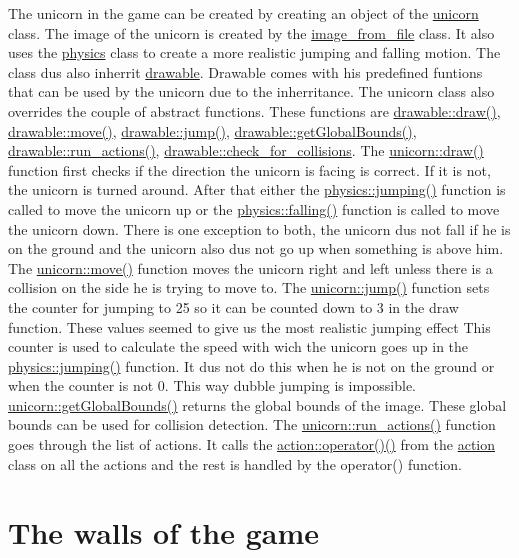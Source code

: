 The unicorn in the game can be created by creating an object of the \hyperlink{classunicorn}{unicorn} class. The image of the unicorn is created by the \hyperlink{classimage__from__file}{image\+\_\+from\+\_\+file} class. It also uses the \hyperlink{classphysics}{physics} class to create a more realistic jumping and falling motion. The class dus also inherrit \hyperlink{classdrawable}{drawable}. Drawable comes with his predefined funtions that can be used by the unicorn due to the inherritance. The unicorn class also overrides the couple of abstract functions. These functions are \hyperlink{classdrawable_a4e49e2c1121704c83ce24c5f48dd910f}{drawable\+::draw()}, \hyperlink{classdrawable_ad0d3930c045cc6776aa2c3965be32491}{drawable\+::move()}, \hyperlink{classdrawable_ac39691470b7874f5dec59efe649d3981}{drawable\+::jump()}, \hyperlink{classdrawable_ae013ac0be47538be9ce885d6642daf73}{drawable\+::get\+Global\+Bounds()}, \hyperlink{classdrawable_a715df01a318331e5611a2b0ad30109ff}{drawable\+::run\+\_\+actions()}, \hyperlink{classdrawable_abbc6e0089d502ba48c3fcb9c96e3966e}{drawable\+::check\+\_\+for\+\_\+collisions}. The \hyperlink{classunicorn_a570c34d5669a8d2a61bdc1481e6f9dee}{unicorn\+::draw()} function first checks if the direction the unicorn is facing is correct. If it is not, the unicorn is turned around. After that either the \hyperlink{classphysics_aaf1c57aa6e35b9c83ccbfdfa8c18468c}{physics\+::jumping()} function is called to move the unicorn up or the \hyperlink{classphysics_acca1ee2fb8b760b6e4ee61ae7c2ee3da}{physics\+::falling()} function is called to move the unicorn down. There is one exception to both, the unicorn dus not fall if he is on the ground and the unicorn also dus not go up when something is above him. The \hyperlink{classunicorn_a162f200a68342f7bc0baaf17c8cf3f9f}{unicorn\+::move()} function moves the unicorn right and left unless there is a collision on the side he is trying to move to. The \hyperlink{classunicorn_a07d5ca4e66632c0e871221a27146805a}{unicorn\+::jump()} function sets the counter for jumping to 25 so it can be counted down to 3 in the draw function. These values seemed to give us the most realistic jumping effect This counter is used to calculate the speed with wich the unicorn goes up in the \hyperlink{classphysics_aaf1c57aa6e35b9c83ccbfdfa8c18468c}{physics\+::jumping()} function. It dus not do this when he is not on the ground or when the counter is not 0. This way dubble jumping is impossible. \hyperlink{classunicorn_a1bac09fc59b04f14f5a093bc4daa04da}{unicorn\+::get\+Global\+Bounds()} returns the global bounds of the image. These global bounds can be used for collision detection. The \hyperlink{classunicorn_aadb47a9981c46d6add8704074df117df}{unicorn\+::run\+\_\+actions()} function goes through the list of actions. It calls the \hyperlink{classaction_a92c003677656b5b3e6e58b19376e6b04}{action\+::operator()()} from the \hyperlink{classaction}{action} class on all the actions and the rest is handled by the operator() function.\hypertarget{index_wall}{}\section{The walls of the game}\label{index_wall}

